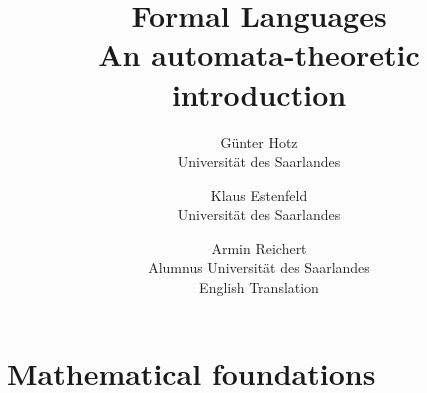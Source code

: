 \documentclass{amsbook}
\begin{document}
\title{
	Formal Languages\\
	An automata-theoretic introduction}

\author{
	G\"unter Hotz\\
	Universit\"at des Saarlandes
\and
	Klaus Estenfeld\\
	Universit\"at des Saarlandes
\and
	Armin Reichert\\
	Alumnus Universit\"at des Saarlandes\\
	English Translation
}

\maketitle


\tableofcontents


\chapter{Mathematical foundations}





\end{document}
